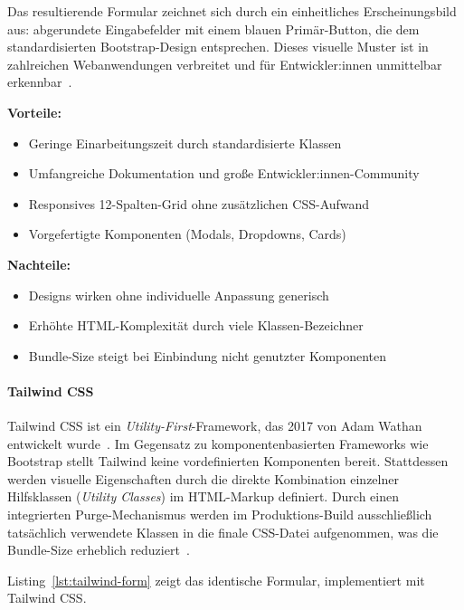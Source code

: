 Das resultierende Formular zeichnet sich durch ein einheitliches Erscheinungsbild
aus: abgerundete Eingabefelder mit einem blauen
Primär-Button, die dem standardisierten Bootstrap-Design entsprechen.
Dieses visuelle Muster ist in zahlreichen Webanwendungen verbreitet und
für Entwickler:innen unmittelbar erkennbar~\cite{bootstrap2023docs}.

\textbf{Vorteile:}
\begin{itemize}
  \item Geringe Einarbeitungszeit durch standardisierte Klassen
  \item Umfangreiche Dokumentation und große Entwickler:innen-Community
  \item Responsives 12-Spalten-Grid ohne zusätzlichen CSS-Aufwand
  \item Vorgefertigte Komponenten (Modals, Dropdowns, Cards)
\end{itemize}

\textbf{Nachteile:}
\begin{itemize}
  \item Designs wirken ohne individuelle Anpassung generisch~
  \item Erhöhte HTML-Komplexität durch viele Klassen-Bezeichner
  \item Bundle-Size steigt bei Einbindung nicht genutzter Komponenten
\end{itemize}

\paragraph{Tailwind CSS}

Tailwind CSS ist ein \textit{Utility-First}-Framework, das 2017 von Adam
Wathan entwickelt wurde~\cite{tailwind2023docs}.
Im Gegensatz zu komponentenbasierten Frameworks wie Bootstrap stellt
Tailwind keine vordefinierten Komponenten bereit.
Stattdessen werden visuelle Eigenschaften durch die direkte Kombination
einzelner Hilfsklassen (\textit{Utility Classes}) im HTML-Markup definiert.
Durch einen integrierten Purge-Mechanismus werden im Produktions-Build
ausschließlich tatsächlich verwendete Klassen in die finale CSS-Datei
aufgenommen, was die Bundle-Size erheblich reduziert~\cite{tailwind2023docs}.

Listing~\ref{lst:tailwind-form} zeigt das identische Formular,
implementiert mit Tailwind CSS.

